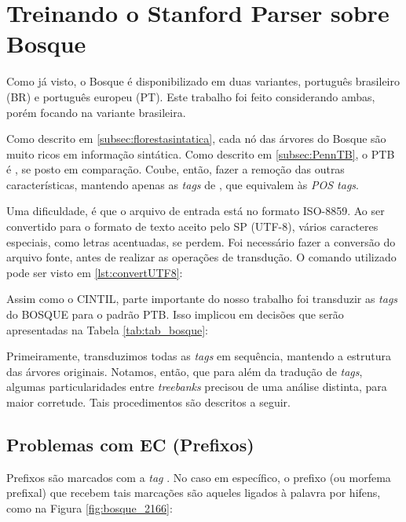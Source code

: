 \section{Treinando o Stanford Parser sobre Bosque}
\label{sec:treinando_sp_bosque}

Como já visto, o Bosque é disponibilizado em duas variantes, português brasileiro (BR) e português europeu (PT). Este trabalho foi feito considerando ambas, porém focando na variante brasileira.

Como descrito em \ref{subsec:florestasintatica}, cada nó das árvores do Bosque são muito ricos em informação sintática. Como descrito em \ref{subsec:PennTB}, o PTB é , se posto em comparação. Coube, então, fazer a remoção das outras características, mantendo apenas as \textit{tags} de , que equivalem às \textit{POS tags}.

Uma dificuldade, é que o arquivo de entrada está no formato ISO-8859. Ao ser convertido para o formato de texto aceito pelo SP (UTF-8), vários caracteres especiais, como letras acentuadas, se perdem. Foi necessário fazer a conversão do arquivo fonte, antes de realizar as operações de transdução. O comando utilizado pode ser visto em \ref{lst:convertUTF8}:
\begin{center}
    
\end{center}
Assim como o CINTIL, parte importante do nosso trabalho foi transduzir as \textit{tags} do BOSQUE para o padrão PTB. Isso implicou em decisões que serão apresentadas na Tabela \ref{tab:tab_bosque}:

\begin{center}
    
\end{center}

Primeiramente, transduzimos todas as \textit{tags} em sequência, mantendo a estrutura das árvores originais. Notamos, então, que para além da tradução de \textit{tags}, algumas particularidades entre \textit{treebanks} precisou de uma análise distinta, para maior corretude. Tais procedimentos são descritos a seguir.
\subsection{Problemas com EC (Prefixos)}
\label{subsec:sec_ec}

Prefixos são marcados com a \textit{tag} .
No caso em específico, o prefixo (ou morfema prefixal) que recebem tais marcações são aqueles ligados à palavra por hifens, como na Figura \ref{fig:bosque_2166}:

